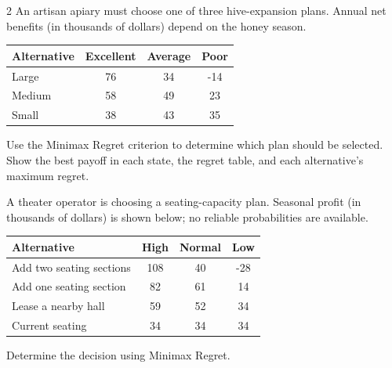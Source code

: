 \begin{multicols}{2}
		An artisan apiary must choose one of three hive-expansion plans. Annual net benefits (in thousands of dollars) depend on the honey season.\vspace{-3mm}
		\begin{center}
			\setlength{\tabcolsep}{3pt}
			\renewcommand{\arraystretch}{1.1}
			\begin{tabular}{lccc}\toprule
			Alternative & Excellent & Average & Poor\\ \midrule
			Large&76&34&-14\\
			Medium&58&49&23\\
			Small&38&43&35\\ \bottomrule
			\end{tabular}
		\end{center}\vspace{-3mm}
		Use the Minimax Regret criterion to determine which plan should be selected. Show the best payoff in each state, the regret table, and each alternative's maximum regret.

		A theater operator is choosing a seating-capacity plan. Seasonal profit (in thousands of dollars) is shown below; no reliable probabilities are available.\vspace{-3mm}
		\begin{center}\setlength{\tabcolsep}{2pt}\renewcommand{\arraystretch}{1.1}
			\begin{tabular}{lccc}\toprule
			Alternative & High & Normal & Low\\ \midrule
			Add two seating sections&108&40&-28\\
			Add one seating section&82&61&14\\
			Lease a nearby hall&59&52&34\\
			Current seating&34&34&34\\ \bottomrule
			\end{tabular}
		\end{center}\vspace{-3mm}
		Determine the decision using Minimax Regret.

		\columnbreak


\end{multicols}
